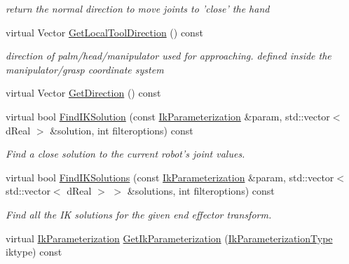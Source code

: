 \begin{DoxyCompactItemize}
\begin{DoxyCompactList}\small\item\em return the normal direction to move joints to 'close' the hand \item\end{DoxyCompactList}\item 
\hypertarget{classOpenRAVE_1_1RobotBase_1_1Manipulator_ad07d05c88555a8420be3012a74950a00}{
virtual Vector \hyperlink{classOpenRAVE_1_1RobotBase_1_1Manipulator_ad07d05c88555a8420be3012a74950a00}{GetLocalToolDirection} () const }
\label{classOpenRAVE_1_1RobotBase_1_1Manipulator_ad07d05c88555a8420be3012a74950a00}

\begin{DoxyCompactList}\small\item\em direction of palm/head/manipulator used for approaching. defined inside the manipulator/grasp coordinate system \item\end{DoxyCompactList}\item 
virtual Vector \hyperlink{classOpenRAVE_1_1RobotBase_1_1Manipulator_a92a9ef35f92ddbef89fc434defe397fc}{GetDirection} () const 
\item 
virtual bool \hyperlink{classOpenRAVE_1_1RobotBase_1_1Manipulator_afe8f72c898a5e9200f5132a2a58e52cb}{FindIKSolution} (const \hyperlink{classOpenRAVE_1_1IkParameterization}{IkParameterization} \&param, std::vector$<$ dReal $>$ \&solution, int filteroptions) const 
\begin{DoxyCompactList}\small\item\em Find a close solution to the current robot's joint values. \item\end{DoxyCompactList}\item 
virtual bool \hyperlink{classOpenRAVE_1_1RobotBase_1_1Manipulator_a89829fe0eeca1eb5ca8424bc8575b346}{FindIKSolutions} (const \hyperlink{classOpenRAVE_1_1IkParameterization}{IkParameterization} \&param, std::vector$<$ std::vector$<$ dReal $>$ $>$ \&solutions, int filteroptions) const 
\begin{DoxyCompactList}\small\item\em Find all the IK solutions for the given end effector transform. \item\end{DoxyCompactList}\item 
virtual \hyperlink{classOpenRAVE_1_1IkParameterization}{IkParameterization} \hyperlink{classOpenRAVE_1_1RobotBase_1_1Manipulator_af4452ae2258d7656aa374bc0530edc1f}{GetIkParameterization} (\hyperlink{namespaceOpenRAVE_a16f7833e516a35d385ac594a44e44a2e}{IkParameterizationType} iktype) const 

\end{DoxyCompactItemize}
